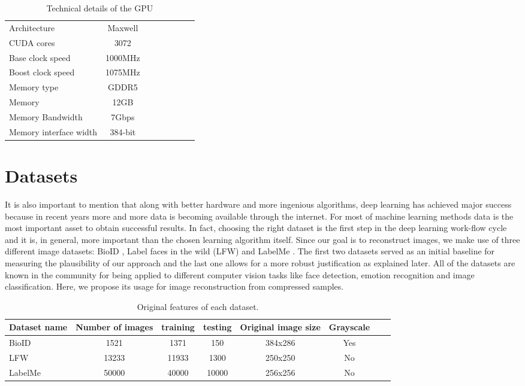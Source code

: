 \begin{table}[!htb]
\caption[Technical speficications of GeForce GTX Titan]{Technical details of the GPU}
\label{tab:GPU1}
\centering
\begin{tabular}{l*{6}{c}r}
\hline
Architecture   & Maxwell\\
CUDA cores   & 3072\\
Base clock speed   & 1000MHz\\
Boost clock speed   & 1075MHz\\
Memory type   & GDDR5\\
Memory    & 12GB\\
Memory Bandwidth    & 7Gbps\\
Memory interface width    & 384-bit\\
\bottomrule 
\end{tabular}  
\end{table}

\FloatBarrier

\section{Datasets}
It is also important to mention that along with better hardware and more ingenious algorithms, deep learning has achieved major success because in recent years more and more data is becoming available through the internet. For most of machine learning methods data is the most important asset to obtain successful results. In fact, choosing the right dataset is the first step in the deep learning work-flow cycle and it is, in general, more important than the chosen learning algorithm itself. 
\newline
Since our goal is to reconstruct images, we make use of three different image datasets: BioID \cite{frischholz2003bioid}, Label faces in the wild (LFW) \cite{LFWTech} and LabelMe \cite{russell2008labelme}. The first two datasets served as an initial baseline for measuring the plausibility of our approach and the last one allows for a more robust justification as explained later. All of the datasets are known in the community for being applied to different computer vision tasks like face detection, emotion recognition and image classification. Here, we propose its usage for image reconstruction from compressed samples.

\vspace{0.5cm}    
 
\begin{table}[!htb]
\caption[Datasets for training and testing]{Original features of each dataset.}
\label{tab:datasets1}
\centering
\begin{tabular}{l*{6}{c}r}
Dataset name              & Number of images & training & testing &  Original image size& Grayscale \\
\hline
BioID   & 1521 & 1371 & 150 & 384x286 & Yes\\
LFW     & 13233 & 11933 & 1300 & 250x250 & No\\
LabelMe & 50000 & 40000 & 10000 & 256x256 & No\\
\bottomrule 
\end{tabular}  
\end{table}

